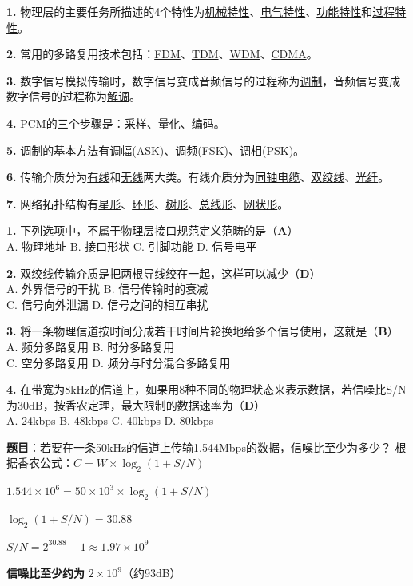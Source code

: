 \begin{examplebox}[填空题]
\textbf{1.} 物理层的主要任务所描述的4个特性为\underline{机械特性}、\underline{电气特性}、\underline{功能特性}和\underline{过程特性}。

\textbf{2.} 常用的多路复用技术包括：\underline{FDM}、\underline{TDM}、\underline{WDM}、\underline{CDMA}。

\textbf{3.} 数字信号模拟传输时，数字信号变成音频信号的过程称为\underline{调制}，音频信号变成数字信号的过程称为\underline{解调}。

\textbf{4.} PCM的三个步骤是：\underline{采样}、\underline{量化}、\underline{编码}。

\textbf{5.} 调制的基本方法有\underline{调幅(ASK)}、\underline{调频(FSK)}、\underline{调相(PSK)}。

\textbf{6.} 传输介质分为\underline{有线}和\underline{无线}两大类。有线介质分为\underline{同轴电缆}、\underline{双绞线}、\underline{光纤}。

\textbf{7.} 网络拓扑结构有\underline{星形}、\underline{环形}、\underline{树形}、\underline{总线形}、\underline{网状形}。
\end{examplebox}

\begin{examplebox}[选择题]
\textbf{1.} 下列选项中，不属于物理层接口规范定义范畴的是（\textbf{A}）\\
A. 物理地址 \quad B. 接口形状 \quad C. 引脚功能 \quad D. 信号电平

\textbf{2.} 双绞线传输介质是把两根导线绞在一起，这样可以减少（\textbf{D}）\\
A. 外界信号的干扰 \quad B. 信号传输时的衰减\\
C. 信号向外泄漏 \quad D. 信号之间的相互串扰

\textbf{3.} 将一条物理信道按时间分成若干时间片轮换地给多个信号使用，这就是（\textbf{B}）\\
A. 频分多路复用 \quad B. 时分多路复用\\
C. 空分多路复用 \quad D. 频分与时分混合多路复用

\textbf{4.} 在带宽为8kHz的信道上，如果用8种不同的物理状态来表示数据，若信噪比S/N为30dB，按香农定理，最大限制的数据速率为（\textbf{D}）\\
A. 24kbps \quad B. 48kbps \quad C. 40kbps \quad D. 80kbps
\end{examplebox}

\begin{examplebox}
\textbf{题目}：若要在一条50kHz的信道上传输1.544Mbps的数据，信噪比至少为多少？
\tcblower
根据香农公式：$C = W \times \log_2(1 + S/N)$

$1.544 \times 10^6 = 50 \times 10^3 \times \log_2(1 + S/N)$

$\log_2(1 + S/N) = 30.88$

$S/N = 2^{30.88} - 1 \approx 1.97 \times 10^9$

\textbf{信噪比至少约为} $2 \times 10^9$（约93dB）
\end{examplebox}

